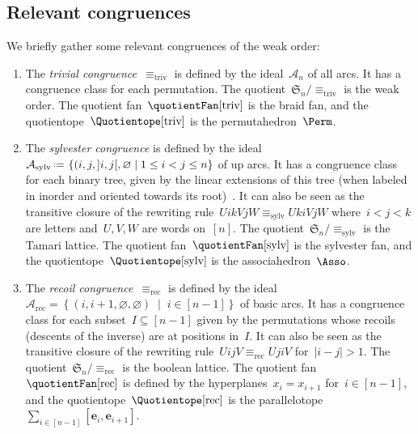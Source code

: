 \documentclass{amsart}
\theoremstyle{definition}
\newcommand{\f}[1]{{\mathfrak{#1}}} %
\renewcommand{\b}[1]{{\boldsymbol{#1}}} %
\newcommand{\set}[2]{\left\{ #1 \;\middle|\; #2 \right\}} %
\newcommand{\eqdef}{\mbox{\,\raisebox{0.2ex}{\scriptsize\ensuremath{\mathrm:}}\ensuremath{=}\,}} %
\newcommand{\darkblue}{\color{darkblue}} %
\newcommand{\defn}[1]{\textsl{\darkblue #1}} %
\newcommand{\vincent}[1]{\todo[color=blue!30]{#1 \\ \hfill --- V.}}
\newcommand{\arcs}{{\mathcal{A}}} %
\begin{document}

\subsection{Relevant congruences}
\label{subsec:relevantCongruences}

We briefly gather some relevant congruences of the weak order:
\vincent{Not sure we need all of them}

\begin{enumerate}
\item \label{item:trivialCongruence}
The \defn{trivial congruence}~$\equiv_\textrm{triv}$ is defined by the ideal~$\arcs_n$ of all arcs.
It has a congruence class for each permutation.
The quotient~$\f{S}_n/{\equiv_\textrm{triv}}$ is the weak order.
The quotient fan~$\quotientFan[\textrm{triv}]$ is the braid fan, and the quotientope~$\Quotientope[\textrm{triv}]$ is the permutahedron~$\Perm$.

\item \label{item:sylvesterCongruence}
The \defn{sylvester congruence} is defined by the ideal~$\arcs_\textrm{sylv} \eqdef \set{(i, j, {]i,j[}, \varnothing}{1 \le i < j \le n}$ of up arcs.
It has a congruence class for each binary tree, given by the linear extensions of this tree (when labeled in inorder and oriented towards its root)~\cite{Tonks, HivertNovelliThibon-algebraBinarySearchTrees}.
It can also be seen as the transitive closure of the rewriting rule~$U i k V j W \equiv_\textrm{sylv} U k i V j W$ where~$i < j < k$ are letters and~$U,V,W$ are words on~$[n]$.
The quotient~$\f{S}_n/{\equiv_\textrm{sylv}}$ is the Tamari lattice.
The quotient fan~$\quotientFan[\textrm{sylv}]$ is the sylvester fan, and the quotientope~$\Quotientope[\textrm{sylv}]$ is the associahedron~$\Asso$.

\item \label{item:recoilCongruence}
The \defn{recoil congruence}~$\equiv_\textrm{rec}$ is defined by the ideal~$\arcs_\textrm{rec} = \set{(i, i+1, \varnothing, \varnothing)}{i \in [n-1]}$ of basic arcs.
It has a congruence class for each subset~$I \subseteq [n-1]$ given by the permutations whose recoils (descents of the inverse) are at positions in~$I$.
It can also be seen as the transitive closure of the rewriting rule~$U i j V \equiv_{\textrm{rec}} U j i V$ for~$|i - j| > 1$.
The quotient~$\f{S}_n/{\equiv_\textrm{rec}}$ is the boolean lattice.
The quotient fan~$\quotientFan[\textrm{rec}]$ is defined by the hyperplanes~$x_i = x_{i+1}$ for~$i \in [n-1]$, and the quotientope~$\Quotientope[\textrm{rec}]$ is the parallelotope~$\sum_{i \in [n-1]} [\b{e}_i, \b{e}_{i+1}]$.


\end{enumerate}
\end{document}
